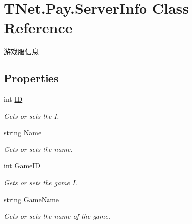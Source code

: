 \hypertarget{class_t_net_1_1_pay_1_1_server_info}{}\section{T\+Net.\+Pay.\+Server\+Info Class Reference}
\label{class_t_net_1_1_pay_1_1_server_info}


游戏服信息  


\subsection*{Properties}
\begin{DoxyCompactItemize}
\item 
int \mbox{\hyperlink{class_t_net_1_1_pay_1_1_server_info_aae4daf9948f096b920deee0f19cbf877}{ID}}
\begin{DoxyCompactList}\small\item\em Gets or sets the I. \end{DoxyCompactList}\item 
string \mbox{\hyperlink{class_t_net_1_1_pay_1_1_server_info_a37ddc97be7197b1153fdef62e49be593}{Name}}
\begin{DoxyCompactList}\small\item\em Gets or sets the name. \end{DoxyCompactList}\item 
int \mbox{\hyperlink{class_t_net_1_1_pay_1_1_server_info_a9252b906af7cdfd7049c88512cdccbc3}{Game\+ID}}
\begin{DoxyCompactList}\small\item\em Gets or sets the game I. \end{DoxyCompactList}\item 
string \mbox{\hyperlink{class_t_net_1_1_pay_1_1_server_info_a403df9a160fc249bf751ba3ccb68c63a}{Game\+Name}}
\begin{DoxyCompactList}\small\item\em Gets or sets the name of the game. \end{DoxyCompactList}\end{DoxyCompactItemize}


